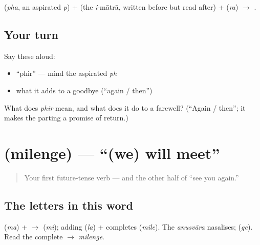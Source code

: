 \begin{sounds}
 (\emph{pha}, an aspirated \emph{p}) +  (the \emph{i}-mātrā, written before but read after) +  (\emph{ra}) $\to$ .
\end{sounds}

\subsection*{Your turn}
Say these aloud:

\begin{itemize}
\raggedright
  \item \textquotedblleft{}phir\textquotedblright{} — mind the aspirated \emph{ph}
  \item what it adds to a goodbye (\textquotedblleft{}again / then\textquotedblright{})
\end{itemize}

\begin{tcolorbox}[breakable,colback=teal!4,colframe=teal!35!black,title={Before you move on}]
What does \emph{phir} mean, and what does it do to a farewell? (\textquotedblleft{}Again / then\textquotedblright{}; it makes the parting a promise of return.)
\end{tcolorbox}
\section[\texorpdfstring{\hi{मिलेंगे} / \hi{मिलना} … (mileṅge / milnā …)}{मिलेंगे / मिलना … (mileṅge / milnā …)}]{ (milenge) — \textquotedblleft{}(we) will meet\textquotedblright{}}

\label{lesson:HI-C04-milenge}



\begin{quote}
Your first future-tense verb — and the other half of \textquotedblleft{}see you again.\textquotedblright{}
\end{quote}

\subsection*{The letters in this word}
\textbf{} (\emph{ma}) + \textbf{}$\to$\textbf{} (\emph{mi}); adding \textbf{} (\emph{la}) + \textbf{} completes \textbf{} (\emph{mile}). The \emph{anusvāra} \textbf{} nasalises; \textbf{} (\emph{ge}). Read the complete \textbf{} $\to$ \emph{milenge}.

